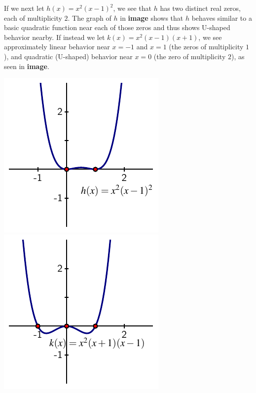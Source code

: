 \documentclass{ximera}
\begin{document}
If we next let $h(x) = x^2 (x-1)^2$, we see that $h$ has two distinct real zeros, each of multiplicity $2$.  The graph of $h$ in \textbf{image} shows that $h$ behaves similar to a basic quadratic function near each of those zeros and thus shows U-shaped behavior nearby.  If instead we let $k(x) = x^2(x-1)(x+1)$, we see approximately linear behavior near $x = -1$ and $x = 1$ (the zeros of multiplicity $1$), and quadratic (U-shaped) behavior near $x = 0$ (the zero of multiplicity $2$), as seen in \textbf{image}.%
\begin{image}
\includegraphics[width=1\linewidth]{images/polynomial-2-2}
\includegraphics[width=1\linewidth]{images/polynomial-2-1-1}
\end{image}
\end{document}
